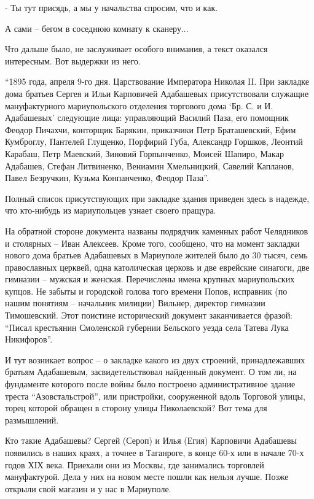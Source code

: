 - Ты тут присядь, а мы у начальства спросим, что и как.

А сами – бегом в соседнюю комнату к сканеру...

Что дальше было, не заслуживает особого внимания, а текст оказался интересным. Вот выдержки из него. 

\enquote{1895 года, апреля 9-го дня. Царствование Императора Николая II. При закладке
дома братьев Сергея и Ильи Карповичей Адабашевых присутствовали служащие
мануфактурного мариупольского отделения торгового дома \enquote{Бр. С. и И. Адабашевых}
следующие лица: управляющий Василий Паза, его помощник Феодор Пичахчи,
конторщик Барякин, приказчики Петр Браташевский, Ефим Кумброглу, Пантелей
Глущенко, Порфирий Губа, Александр Горшков, Леонтий Карабаш, Петр Маевский,
Зиновий Горпынченко, Моисей Шапиро, Макар Адабашев, Стефан Литвиненко, Вениамин
Хмельницкий, Савелий Капланов, Павел Безручкин, Кузьма Конпанченко, Феодор
Паза}.

Полный список присутствующих при закладке здания  приведен здесь в надежде, что
кто-нибудь из мариупольцев узнает своего пращура. 

На обратной стороне документа названы подрядчик каменных работ Челядников и
столярных – Иван Алексеев. Кроме того, сообщено, что на момент закладки нового
дома братьев Адабашевых  в Мариуполе жителей было до 30 тысяч, семь
православных церквей, одна католическая церковь и две еврейские синагоги, две
гимназии – мужская и женская. Перечислены имена крупных мариупольских купцов.
Не забыты и городской голова того времени Попов, исправник (по нашим понятиям –
начальник милиции) Вильнер, директор гимназии Тимошевский. Этот поистине
исторический документ заканчивается фразой: \enquote{Писал крестьянин Смоленской
губернии Бельского уезда села Татева Лука Никифоров}.

И тут возникает вопрос – о закладке какого из двух строений, принадлежавших
братьям Адабашевым, засвидетельствовал найденный документ. О том ли, на
фундаменте которого после войны было построено административное здание  треста
\enquote{Азовстальстрой}, или пристройки, сооруженной вдоль Торговой улицы,  торец
которой обращен в сторону улицы Николаевской? Вот тема для размышлений.

Кто такие Адабашевы? Сергей (Сероп) и Илья (Егия) Карповичи  Адабашевы
появились в наших краях, а точнее в Таганроге, в конце 60-х или в начале 70-х
годов ХIХ века. Приехали они из Москвы, где занимались торговлей мануфактурой.
Дела у них на новом месте пошли как нельзя лучше. Позже открыли свой магазин и
у нас в Мариуполе.

